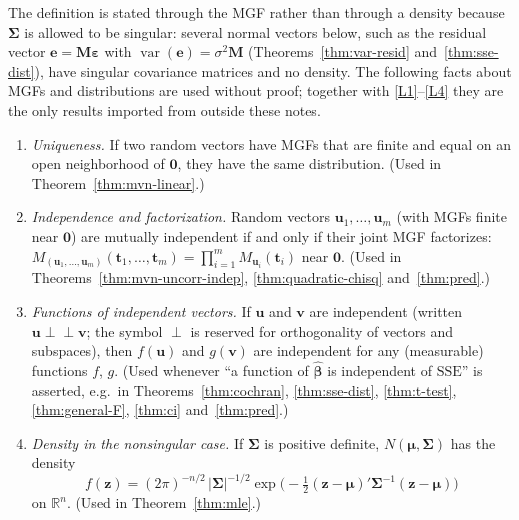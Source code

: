 \documentclass[14pt]{extarticle}
\theoremstyle{plain}
\theoremstyle{definition}
\theoremstyle{remark}
\DeclareMathOperator\var{var}
\newcommand{\SSE}{\mathrm{SSE}}
\def\bb{\boldsymbol{\beta}}
\newcommand{\be}{\boldsymbol{\varepsilon}}
\newcommand{\bM}{\mathbf{M}}
\newcommand{\bzero}{\mathbf{0}}
\newcommand{\bz}{\mathbf{z}}
\newcommand{\bv}{\mathbf{v}}
\newcommand{\Real}{\mathbb{R}}
\newcommand{\indep}{\perp\!\!\!\perp}
\newcommand{\bu}{\mathbf{u}}
\begin{document}
The definition is stated through the MGF rather than through a density because $\boldsymbol\Sigma$ is allowed to be singular: several normal vectors below, such as the residual vector $\mathbf{e} = \bM\be$ with $\var(\mathbf{e}) = \sigma^2\bM$ (Theorems~\ref{thm:var-resid} and~\ref{thm:sse-dist}), have singular covariance matrices and no density. The following facts about MGFs and distributions are used without proof; together with \ref{L1}--\ref{L4} they are the only results imported from outside these notes.
\begin{enumerate}[label=\textup{(N\arabic*)}]
\item\label{N1} \emph{Uniqueness.} If two random vectors have MGFs that are finite and equal on an open neighborhood of $\bzero$, they have the same distribution. (Used in Theorem~\ref{thm:mvn-linear}.)
\item\label{N2} \emph{Independence and factorization.} Random vectors $\bu_1, \ldots, \bu_m$ (with MGFs finite near $\bzero$) are mutually independent if and only if their joint MGF factorizes: $M_{(\bu_1, \ldots, \bu_m)}(\mathbf{t}_1, \ldots, \mathbf{t}_m) = \prod_{i=1}^m M_{\bu_i}(\mathbf{t}_i)$ near $\bzero$. (Used in Theorems~\ref{thm:mvn-uncorr-indep}, \ref{thm:quadratic-chisq} and~\ref{thm:pred}.)
\item\label{N3} \emph{Functions of independent vectors.} If $\bu$ and $\bv$ are independent (written $\bu \indep \bv$; the symbol $\perp$ is reserved for orthogonality of vectors and subspaces), then $f(\bu)$ and $g(\bv)$ are independent for any (measurable) functions $f$, $g$. (Used whenever ``a function of $\hat{\bb}$ is independent of $\SSE$'' is asserted, e.g.\ in Theorems~\ref{thm:cochran}, \ref{thm:sse-dist}, \ref{thm:t-test}, \ref{thm:general-F}, \ref{thm:ci} and~\ref{thm:pred}.)
\item\label{N4} \emph{Density in the nonsingular case.} If $\boldsymbol\Sigma$ is positive definite, $N(\boldsymbol\mu, \boldsymbol\Sigma)$ has the density
\[
f(\bz) = (2\pi)^{-n/2}\,|\boldsymbol\Sigma|^{-1/2}\exp\bigl(-\tfrac{1}{2}(\bz - \boldsymbol\mu)'\boldsymbol\Sigma^{-1}(\bz - \boldsymbol\mu)\bigr)
\]
on $\Real^n$. (Used in Theorem~\ref{thm:mle}.)

\end{enumerate}
\end{document}
